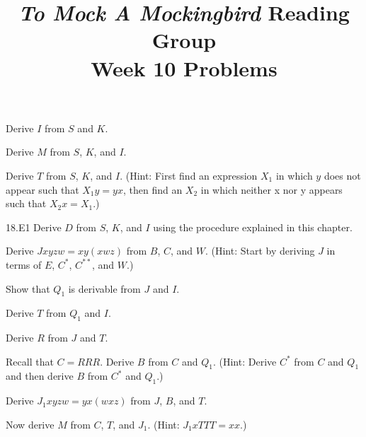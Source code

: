 \documentclass[12pt, letterpaper]{article}
\title{\emph{To Mock A Mockingbird} Reading Group\\Week 10 Problems}
\begin{document}
\maketitle
\setcounter{section}{18}

\begin{prob}{18.1}  
Derive $I$ from $S$ and $K$.
\end{prob}

\begin{prob}{18.2}  
Derive $M$ from $S$, $K$, and $I$.
\end{prob}

\begin{prob}{18.3}  
Derive $T$ from $S$, $K$, and $I$. (Hint: First find an expression $X_1$ in which $y$ does not appear such that $X_1y = yx$, then find an $X_2$ in which neither x nor y appears such that $X_2x = X_1$.)
\end{prob}

\begin{prob}{18.E1} 
Derive $D$ from $S$, $K$, and $I$ using the procedure explained in this chapter.
\end{prob}

\begin{prob}{19.1}  
Derive $Jxyzw = xy(xwz)$ from $B$, $C$, and $W$. (Hint: Start by deriving $J$ in terms of $E$, $C^*$, $C^{**}$, and $W$.)
\end{prob}

\begin{prob}{19.2}  
Show that $Q_1$ is derivable from $J$ and $I$.
\end{prob}

\begin{prob}{19.3}  
Derive $T$ from $Q_1$ and $I$.
\end{prob}

\begin{prob}{19.4}  
Derive $R$ from $J$ and $T$.
\end{prob}

\begin{prob}{19.5}  
Recall that $C = RRR$. Derive $B$ from $C$ and $Q_1$. (Hint: Derive $C^*$ from $C$ and $Q_1$ and then derive $B$ from $C^*$ and $Q_1$.)
\end{prob}

\begin{prob}{19.6}  
Derive $J_1xyzw = yx(wxz)$ from $J$, $B$, and $T$.
\end{prob}

\begin{prob}{19.7}  
Now derive $M$ from $C$, $T$, and $J_1$. (Hint: $J_1xTTT = xx$.)
\end{prob}
\end{document}
